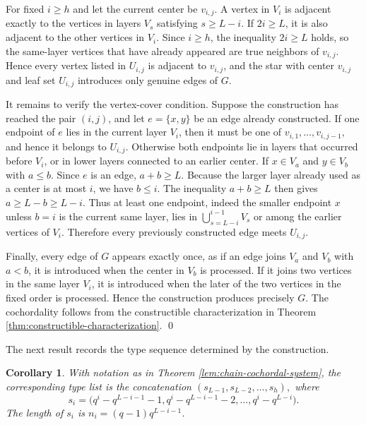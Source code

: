 \documentclass[12pt]{article}
\newtheorem{corollary}[theorem]{Corollary}
\theoremstyle{definition}
\renewenvironment{proof}{{\bf \noindent Proof.}}{\qed}
\begin{document}
\begin{proof}
	For fixed $i\geq h$ and let the current center be $v_{i,j}$.  A vertex in $V_i$ is adjacent exactly to the vertices in layers $V_s$ satisfying $s\geq L-i$.  If $2i\geq L$, it is also adjacent to the other vertices in $V_i$.  Since $i\geq h$, the inequality $2i\geq L$ holds, so the same-layer vertices that have already appeared are true neighbors of $v_{i,j}$.  Hence every vertex listed in $U_{i,j}$ is adjacent to $v_{i,j}$, and the star with center $v_{i,j}$ and leaf set $U_{i,j}$ introduces only genuine edges of $G$.
	
	\medskip
	
	It remains to verify the vertex-cover condition.  Suppose the construction has reached the pair $(i,j)$, and let $e=\{x,y\}$ be an edge already constructed.  If one endpoint of $e$ lies in the current layer $V_i$, then it must be one of $v_{i,1},\ldots,v_{i,j-1}$, and hence it belongs to $U_{i,j}$.  Otherwise both endpoints lie in layers that occurred before $V_i$, or in lower layers connected to an earlier center.  If $x\in V_a$ and $y\in V_b$ with $a\leq b$.  Since $e$ is an edge, $a+b\geq L$.  Because the larger layer already used as a center is at most $i$, we have $b\leq i$.  The inequality $a+b\geq L$ then gives $a\geq L-b\geq L-i$.  Thus at least one endpoint, indeed the smaller endpoint $x$ unless $b=i$ is the current same layer, lies in $\bigcup_{s=L-i}^{i-1}V_s$ or among the earlier vertices of $V_i$.  Therefore every previously constructed edge meets $U_{i,j}$.
	
	\medskip
	
	Finally, every edge of $G$ appears exactly once, as if an edge joins $V_a$ and $V_b$ with $a<b$, it is introduced when the center in $V_b$ is processed. If it joins two vertices in the same layer $V_i$, it is introduced when the later of the two vertices in the fixed order is processed.  Hence the construction produces precisely $G$.  The cochordality follows from the constructible characterization in Theorem \ref{thm:constructible-characterization}.
\end{proof}

\medskip

The next result records the type sequence determined by the construction.

\medskip

\begin{corollary}\label{cor:type-chain}
	With notation as in Theorem \ref{lem:chain-cochordal-system}, the corresponding type list is the concatenation
	$ (s_{L-1},s_{L-2},\ldots,s_h), $ where
	$$
	s_i=\bigl(q^i-q^{L-i-1}-1,
	q^i-q^{L-i-1}-2,
	\ldots,
	q^i-q^{L-i}\bigr).
	$$
	The length of $s_i$ is $n_i=(q-1)q^{L-i-1}$.
\end{corollary}
\end{document}
